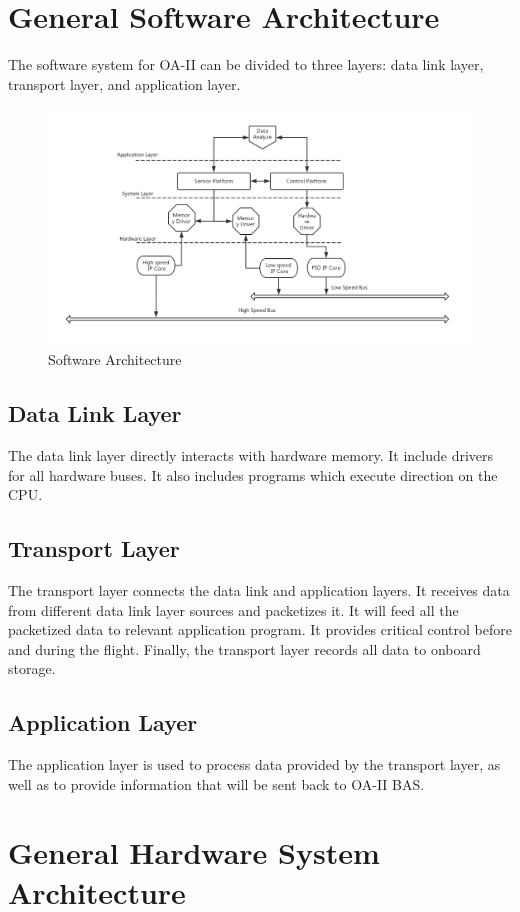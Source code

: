 \documentclass[12pt,article]{memoir}
\begin{document}
\chapter{General Software Architecture}
The software system for OA-II can be divided to three layers: data link layer, transport layer, and application layer.
\begin{figure}[htp]
\includegraphics[width=\textwidth]{img/ES00002_softarch.png}
\caption{Software Architecture}	
\end{figure}
\section{Data Link Layer}
The data link layer directly interacts with hardware memory. It include drivers for all hardware buses. It also includes programs which execute direction on the CPU.
\section{Transport Layer}
The transport layer connects the data link and application layers. It receives data from different data link layer sources and packetizes it. It will feed all the packetized data to relevant application program. It provides critical control before and during the flight. Finally, the transport layer records all data to onboard storage.
\section{Application Layer}
The application layer is used to process data provided by the transport layer, as well as to provide information that will be sent back to OA-II BAS.

\newpage

\chapter{General Hardware System Architecture}
\end{document}
